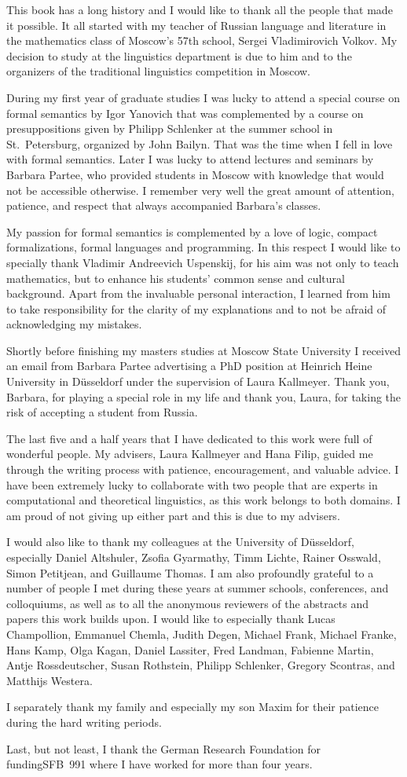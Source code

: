 This book has a long history and I would like to thank all the people that made it possible. It all started with my teacher of Russian language and literature in the mathematics class of Moscow's 57th school, Sergei Vladimirovich Volkov. My decision to study at the linguistics department is due to him and to the organizers of the traditional linguistics competition in Moscow.

During my first year of graduate studies I was lucky to attend a special course on formal semantics by Igor Yanovich that was complemented by a course on presuppositions given by Philipp Schlenker at the summer school in St.\ Petersburg, organized by John Bailyn. That was the time when I fell in love with formal semantics. Later I was lucky to attend lectures and seminars by Barbara Partee, who provided students in Moscow with knowledge that would not be accessible otherwise. I remember very well the great amount of attention, patience, and respect that always accompanied Barbara's classes. 

My passion for formal semantics is complemented by a love of logic, compact formalizations, formal languages and programming. In this respect I would like to specially thank Vladimir Andreevich Uspenskij, for his aim was not only to teach mathematics, but to enhance his students' common sense and cultural background. Apart from the invaluable personal interaction, I learned from him to take responsibility for the clarity of my explanations and to not be afraid of acknowledging my mistakes.

Shortly before finishing my masters studies at Moscow State University I received an email from Barbara Partee advertising a PhD position at Heinrich Heine University in Düsseldorf under the supervision of Laura Kallmeyer. Thank you, Barbara, for playing a special role in my life and thank you, Laura, for taking the risk of accepting a student from Russia.

The last five and a half years that I have dedicated to this work were full of wonderful people. My advisers, Laura Kallmeyer and Hana Filip, guided me through the writing process with patience, encouragement, and valuable advice. I have been extremely lucky to collaborate with two people that are experts in computational and theoretical linguistics, as this work belongs to both domains. I am proud of not giving up either part and this is due to my advisers. 

I would also like to thank my colleagues at the University of Düsseldorf, especially Daniel Altshuler, Zsofia Gyarmathy, Timm Lichte, Rainer Osswald, Simon Petitjean, and Guillaume Thomas. I am also profoundly grateful to a number of people I met during these years at summer schools, conferences, and colloquiums, as well as to all the anonymous reviewers of the abstracts and papers this work builds upon. I would like to especially thank Lucas Champollion, Emmanuel Chemla, Judith Degen, Michael Frank, Michael Franke, Hans Kamp, Olga Kagan, Daniel Lassiter, Fred Landman, Fabienne Martin, Antje Rossdeutscher, Susan Rothstein, Philipp Schlenker, Gregory Scontras, and Matthijs Westera.

I separately thank my family and especially my son Maxim for their patience during the hard writing periods.

Last, but not least, I thank the German Research Foundation for funding\linebreak SFB~991 where I have worked for more than four years. 
